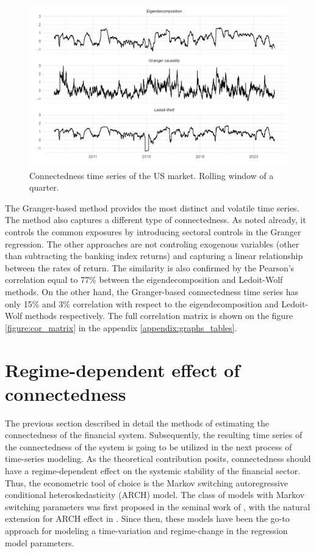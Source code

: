 \documentclass[12pt]{article}
\begin{document}
\begin{figure}
	\centering
	\includegraphics[scale = 0.76]{img/connect_ts.png}
	\caption{Connectedness time series of the US market. Rolling window of a quarter.}
	\label{figure:connect_ts}
\end{figure}

The Granger-based method provides the most distinct and volatile time series. The method also captures a different type of connectedness. As noted already, it controls the common exposures by introducing sectoral controls in the Granger regression. The other approaches are not controling exogenous variables (other than subtracting the banking index returns) and capturing a linear relationship between the rates of return. The similarity is also confirmed by the Pearson's correlation equal to 77\% between the eigendecomposition and Ledoit-Wolf methods. On the other hand, the Granger-based connectedness time series has only 15\% and 3\% correlation with respect to the eigendecomposition and Ledoit-Wolf methods respectively. The full correlation matrix is shown on the figure \ref{figure:cor_matrix} in the appendix \ref{appendix:graphs_tables}.

\section{Regime-dependent effect of connectedness}\label{section:arch_model}

The previous section described in detail the methods of estimating the connectedness of the financial system. Subsequently, the resulting time series of the connectedness of the system is going to be utilized in the next process of time-series modeling. As the theoretical contribution posits, connectedness should have a regime-dependent effect on the systemic stability of the financial sector. Thus, the econometric tool of choice is the Markov switching autoregressive conditional heteroskedasticity (ARCH) model. The class of models with Markov switching parameters was first proposed in the seminal work of \citet{hamilton89}, with the natural extension for ARCH effect in \citet{cai94}. Since then, these models have been the go-to approach for modeling a time-variation and regime-change in the regression model parameters. 
\end{document}
